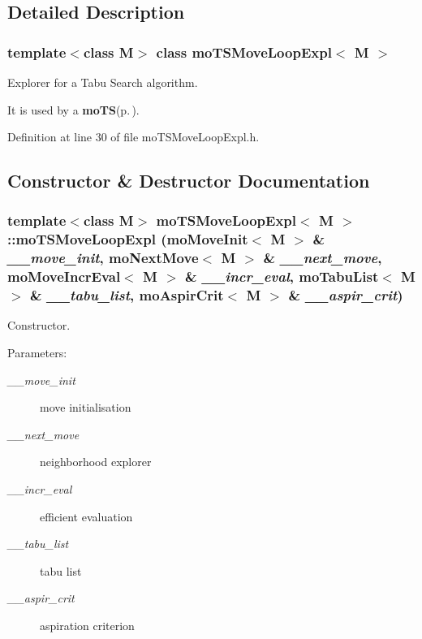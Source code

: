 \subsection{Detailed Description}
\subsubsection*{template$<$class M$>$ class mo\-TSMove\-Loop\-Expl$<$ M $>$}

Explorer for a Tabu Search algorithm. 

It is used by a {\bf mo\-TS}{\rm (p.\,\pageref{classmo_t_s})}. 



Definition at line 30 of file mo\-TSMove\-Loop\-Expl.h.

\subsection{Constructor \& Destructor Documentation}
\subsubsection{\setlength{\rightskip}{0pt plus 5cm}template$<$class M$>$ {\bf mo\-TSMove\-Loop\-Expl}$<$ M $>$::{\bf mo\-TSMove\-Loop\-Expl} ({\bf mo\-Move\-Init}$<$ M $>$ \& {\em \_\-\_\-move\_\-init}, {\bf mo\-Next\-Move}$<$ M $>$ \& {\em \_\-\_\-next\_\-move}, {\bf mo\-Move\-Incr\-Eval}$<$ M $>$ \& {\em \_\-\_\-incr\_\-eval}, {\bf mo\-Tabu\-List}$<$ M $>$ \& {\em \_\-\_\-tabu\_\-list}, {\bf mo\-Aspir\-Crit}$<$ M $>$ \& {\em \_\-\_\-aspir\_\-crit})\hspace{0.3cm}{\tt  [inline]}}\label{classmo_t_s_move_loop_expl_43306dae9df150a8d9dc0dec9cd6a381}


Constructor. 

\begin{Desc}
\item[Parameters:]
\begin{description}
\item[{\em \_\-\_\-move\_\-init}]move initialisation \item[{\em \_\-\_\-next\_\-move}]neighborhood explorer \item[{\em \_\-\_\-incr\_\-eval}]efficient evaluation \item[{\em \_\-\_\-tabu\_\-list}]tabu list \item[{\em \_\-\_\-aspir\_\-crit}]aspiration criterion \end{description}
\end{Desc}


